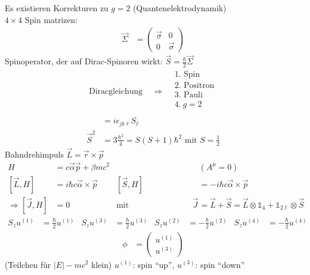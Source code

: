 Es existieren Korrekturen zu $g=2$ (Quantenelektrodynamik)\\
$4\times4$ Spin matrizen:
	\begin{align*}
		\vec{\Sigma} &=
		\begin{pmatrix}
			\vec{\sigma} & 0 \\
			0 & \vec{\sigma} 
		\end{pmatrix}
	\end{align*}
Spinoperator, der auf Dirac-Spinoren wirkt: $\vec{S} = \frac{\hbar}{2} \vec{\Sigma}$
	\begin{align*}
		\text{Diracgleichung } &\Rightarrow
		\begin{aligned}
			&1.\text{ Spin} \\
			&2.\text{ Positron} \\
			&3.\text{ Pauli} \\
			&4. ~g=2 \\
		\end{aligned}
	\end{align*}
	\begin{align*}
		[S_j,S_k] &= i\epsilon_{jk \ell} S_\ell \\
		\vec{S}^2 &= 3 \frac{\hbar^2}{4} =
		S(S + 1) \hbar^2 \text{ mit } S=\frac{1}{2}
	\end{align*}
Bahndrehimpuls $\vec{L} = \vec{r} \times \vec{p}$
	\begin{align*}
		H &= c \vec{\alpha} \vec{p} + \beta mc^2 & &(A^\mu = 0) \\
		[\vec{L}, H] &= i\hbar c \vec{\alpha} \times \vec{p}
		& [\vec{S}, H] &= -i\hbar c \vec{\alpha} \times \vec{p} \\
		\Rightarrow [\vec{J}, H] &= 0
		& \text{mit Gesamtdrehimpuls } 
		\vec{J} &= \vec{L} + \vec{S} = \vec{L} \otimes \mathds{1}_4 + \mathds{1}_{2\ell} \otimes \vec{S}
	\end{align*}
	\begin{align*}
		S_z u^{(1)} &= \frac{\hbar}{2} u^{(1)} &
		S_z u^{(3)} &= \frac{\hbar}{2} u^{(3)} &
		S_z u^{(2)} &= -\frac{\hbar}{2} u^{(2)} &
		S_z u^{(4)} &= -\frac{\hbar}{2} u^{(4)}
	\end{align*}
	\begin{align*}
		\phi &= 
		\begin{pmatrix}
			u^{(1)} \\
			u^{(3)}
		\end{pmatrix}
	\end{align*}
(Teilchen für $|E| - mc^2$ klein) $u^{(1)}$: spin ``up'', $u^{(3)}$: spin ``down''
